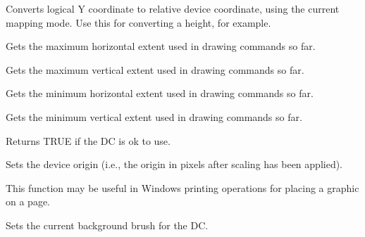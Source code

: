 \label{wxdclogicaltodeviceyrel}


Converts logical Y coordinate to relative device coordinate, using the current
mapping mode. Use this for converting a height, for example.

\label{wxdcmaxx}


Gets the maximum horizontal extent used in drawing commands so far.

\label{wxdcmaxy}


Gets the maximum vertical extent used in drawing commands so far.

\label{wxdcminx}


Gets the minimum horizontal extent used in drawing commands so far.

\label{wxdcminy}


Gets the minimum vertical extent used in drawing commands so far.

\label{wxdcok}


Returns TRUE if the DC is ok to use.

\label{wxdcsetdeviceorigin}


Sets the device origin (i.e., the origin in pixels after scaling has been
applied).

This function may be useful in Windows printing
operations for placing a graphic on a page.

\label{wxdcsetbackground}


Sets the current background brush for the DC.

\label{wxdcsetbackgroundmode}


